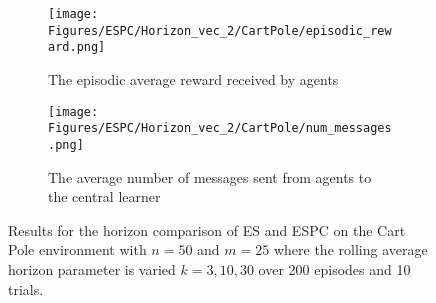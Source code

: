 
\begin{figure}[H]
    \centering
    \begin{subfigure}{0.6\textwidth}
        \centering
        \texttt{[image: Figures/ESPC/Horizon\_vec\_2/CartPole/episodic\_reward.png]}
        \caption{The episodic average reward received by agents}
        \label{fig:HorizonEpisodicReward}
    \end{subfigure}
    \begin{subfigure}{0.6\textwidth}
        \centering
        \texttt{[image: Figures/ESPC/Horizon\_vec\_2/CartPole/num\_messages.png]}
        \caption{The average number of messages sent from agents to the central learner}
        \label{fig:HorizonMessages}
    \end{subfigure}
    \caption{Results for the horizon comparison of ES and ESPC on the Cart Pole environment with $n=50$ and $m=25$ where the rolling average horizon parameter is varied $k=3,10,30$ over 200 episodes and 10 trials.}
    \label{fig:CPHorizon}
\end{figure}

